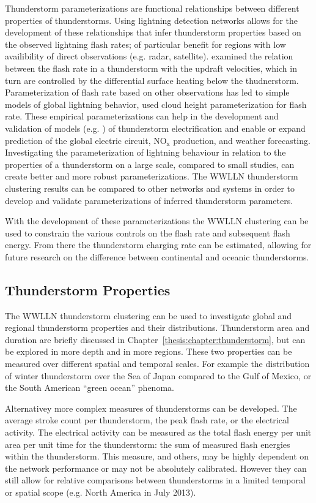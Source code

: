 Thunderstorm parameterizations are functional relationships between different properties of thunderstorms.
Using lightning detection networks allows for the development of these relationships that infer thunderstorm properties based on the observed lightning flash rates; of particular benefit for regions with low availibility of direct observations (e.g. radar, satellite).
\citet{Zipser1994} examined the relation between the flash rate in a thunderstorm with the updraft velocities, which in turn are controlled by the differential surface heating below the thudnerstorm.
Parameterization of flash rate based on other observations has led to simple models of global lightning behavior, \citet{Price1992} used cloud height parameterization for flash rate.
These empirical parameterizations can help in the development and validation of models (e.g. \citet{Baker1999}) of thunderstorm electrification and enable or expand prediction of the global electric circuit, NO$_\text{x}$ production, and weather forecasting.
Investigating the parameterization of lightning behaviour in relation to the properties of a thunderstorm on a large scale, compared to small studies, can create better and more robust parameterizations.
The WWLLN thunderstorm clustering results can be compared to other networks and systems in order to develop and validate parameterizations of inferred thunderstorm parameters.

With the development of these parameterizations the WWLLN clustering can be used to constrain the various controls on the flash rate and subsequent flash energy.
From there the thunderstorm charging rate can be estimated, allowing for future research on the difference between continental and oceanic thunderstorms.

\subsection{Thunderstorm Properties}

The WWLLN thunderstorm clustering can be used to investigate global and regional thunderstorm properties and their distributions.
Thunderstorm area and duration are briefly discussed in Chapter~\ref{thesis:chapter:thunderstorm}, but can be explored in more depth and in more regions.
These two properties can be measured over different spatial and temporal scales.
For example the distribution of winter thunderstorm over the Sea of Japan compared to the Gulf of Mexico, or the South American ``green ocean'' phenoma.

Alternativey more complex measures of thunderstorms can be developed.
The average stroke count per thunderstorm, the peak flash rate, or the electrical activity.
The electrical activity can be measured as the total flash energy per unit area per unit time for the thunderstorm: the sum of measured flash energies within the thunderstorm.
This measure, and others, may be highly dependent on the network performance or may not be absolutely calibrated.
However they can still allow for relative comparisons between thunderstorms in a limited temporal or spatial scope (e.g. North America in July 2013).

